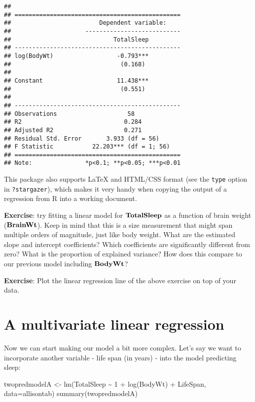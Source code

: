 \documentclass[
]{book}
\newenvironment{Shaded}{\begin{snugshade}}{\end{snugshade}}
\newcommand{\AttributeTok}[1]{\textcolor[rgb]{0.77,0.63,0.00}{#1}}
\newcommand{\DecValTok}[1]{\textcolor[rgb]{0.00,0.00,0.81}{#1}}
\newcommand{\FunctionTok}[1]{\textcolor[rgb]{0.00,0.00,0.00}{#1}}
\newcommand{\NormalTok}[1]{#1}
\newcommand{\OtherTok}[1]{\textcolor[rgb]{0.56,0.35,0.01}{#1}}
\newcommand{\SpecialCharTok}[1]{\textcolor[rgb]{0.00,0.00,0.00}{#1}}
\begin{document}
\begin{verbatim}
## 
## ===============================================
##                         Dependent variable:    
##                     ---------------------------
##                             TotalSleep         
## -----------------------------------------------
## log(BodyWt)                  -0.793***         
##                               (0.168)          
##                                                
## Constant                     11.438***         
##                               (0.551)          
##                                                
## -----------------------------------------------
## Observations                    58             
## R2                             0.284           
## Adjusted R2                    0.271           
## Residual Std. Error       3.933 (df = 56)      
## F Statistic           22.203*** (df = 1; 56)   
## ===============================================
## Note:               *p<0.1; **p<0.05; ***p<0.01
\end{verbatim}

This package also supports LaTeX and HTML/CSS format (see the \texttt{type} option in \texttt{?stargazer}), which makes it very handy when copying the output of a regression from R into a working document.

\textbf{Exercise}: try fitting a linear model for \(\bf{TotalSleep}\) as a function of brain weight (\(\bf{BrainWt}\)). Keep in mind that this is a size measurement that might span multiple orders of magnitude, just like body weight. What are the estimated slope and intercept coefficients? Which coefficients are significantly different from zero? What is the proportion of explained variance? How does this compare to our previous model including \(\bf{BodyWt}\)?

\textbf{Exercise}: Plot the linear regression line of the above exercise on top of your data.

\hypertarget{a-multivariate-linear-regression}{%
\section{A multivariate linear regression}\label{a-multivariate-linear-regression}}

Now we can start making our model a bit more complex. Let's say we want to incorporate another variable - life span (in years) - into the model predicting sleep:

\begin{Shaded}
\begin{Highlighting}[]
\NormalTok{twopredmodelA }\OtherTok{\textless{}{-}} \FunctionTok{lm}\NormalTok{(TotalSleep }\SpecialCharTok{\textasciitilde{}} \DecValTok{1} \SpecialCharTok{+} \FunctionTok{log}\NormalTok{(BodyWt) }\SpecialCharTok{+}\NormalTok{ LifeSpan, }\AttributeTok{data=}\NormalTok{allisontab)}
\FunctionTok{summary}\NormalTok{(twopredmodelA)}
\end{Highlighting}
\end{Shaded}
\end{document}
